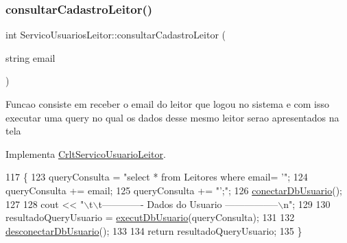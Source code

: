 \mbox{\label{class_servico_usuarios_leitor_a8f34dddc0540f729a701d69f948ffb42}} 
\subsubsection{\texorpdfstring{consultar\+Cadastro\+Leitor()}{consultarCadastroLeitor()}}
{\footnotesize\ttfamily int Servico\+Usuarios\+Leitor\+::consultar\+Cadastro\+Leitor (\begin{DoxyParamCaption}\item[{string}]{email }\end{DoxyParamCaption})\hspace{0.3cm}{\ttfamily [virtual]}}

Funcao consiste em receber o email do leitor que logou no sistema e com isso executar uma query no qual os dados desse mesmo leitor serao apresentados na tela

Implementa \mbox{\hyperlink{class_crlt_servico_usuario_leitor_a4585305b98f21fe233b2c798edb47496}{Crlt\+Servico\+Usuario\+Leitor}}.


\begin{DoxyCode}
117 \{
123   queryConsulta = \textcolor{stringliteral}{"select * from Leitores where email= '"};
124   queryConsulta += email;
125   queryConsulta += \textcolor{stringliteral}{"';"};
126   \mbox{\hyperlink{comando_sql_8cpp_a4f89ddcbc4cf8f2587d89f72f8c7900d}{conectarDbUsuario}}();
127 
128   cout << \textcolor{stringliteral}{"\(\backslash\)t\(\backslash\)t------------- Dados do Usuario -----------------\(\backslash\)n"};
129 
130   resultadoQueryUsuario = \mbox{\hyperlink{comando_sql_8cpp_a748197580e7f9acdbf48c78de1f7924b}{executDbUsuario}}(queryConsulta);
131 
132   \mbox{\hyperlink{comando_sql_8cpp_a969be9911913568e30d4ae8963338bc3}{desconectarDbUsuario}}();
133 
134   \textcolor{keywordflow}{return} resultadoQueryUsuario;
135 \}
\end{DoxyCode}
\mbox{\label{class_servico_usuarios_leitor_a89ed39e45ee1c564e1f62df7154d1b29}} 
